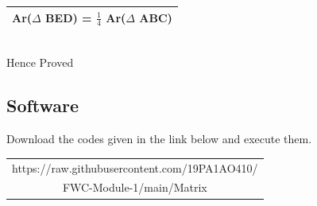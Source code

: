 \documentclass[journal,10pt,twocolumn]{article}
\begin{document}
\vspace{0.5cm}
\centering
\begin{tabular}{|c|}
\hline
Ar($\Delta$ BED) = $\frac{1}{4}$ Ar($\Delta$ ABC)\\
\hline
\end{tabular}\\
\vspace{0.5cm}
Hence Proved

\begin{flushleft}
\section{Software}
\end{flushleft}
Download the codes given in the link below and execute them.\\
\begin{table}[h]
\centering
\begin{tabular}{|c|} \hline
\rule{0pt}{10pt} 
https://raw.githubusercontent.com/19PA1AO410/\\
FWC-Module-1/main/Matrix%
\\\hline
 \end{tabular}
\end{table}

\end{document}
